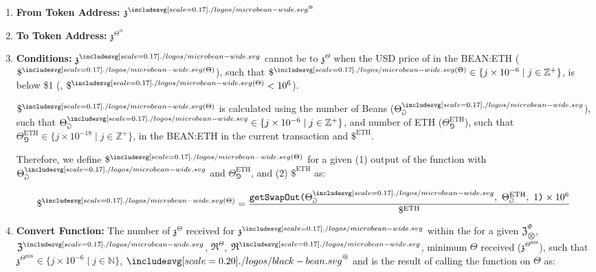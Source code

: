\documentclass[class=article, crop=false]{standalone}
\begin{document}
\begin{enumerate}
    \item \textbf{From Token Address:} $\mathfrak{z}^{\bean^@}$
    
    \item \textbf{To Token Address:} $\mathfrak{z}^{\Theta^@}$
    
    \item \textbf{Conditions:}  \hyperlink{ht233}{$\mathfrak{z}^{\bean}$} cannot be  to  \hyperlink{ht235}{$\mathfrak{z}^{\Theta}$} when the USD price of  in the BEAN:ETH  ($\$^{\bean(\Theta)}$), such that $\$^{\bean(\Theta)}\in \{j \times 10^{-6} \mid j \in \mathbb{Z}^{+} \}$, is below \$1 (, $\$^{\bean(\Theta)} < 10^6$). 

        $\$^{\bean(\Theta)}$ is calculated using the number of Beans ($\Theta_{\Game}^{\bean}$), such that $\Theta_{\Game}^{\bean} \in \{j \times 10^{-6} \mid j \in \mathbb{Z}^{+} \}$, and number of ETH ($\Theta_{\Game}^{\text{ETH}}$), such that $\Theta_{\Game}^{\text{ETH}} \in \{j \times 10^{-18} \mid j \in \mathbb{Z}^{+} \}$, in the BEAN:ETH  in the current transaction and $\$^{\text{ETH}}$.

        Therefore, we define $\$^{\bean(\Theta)}$ for a given (1) output of the   function with $\Theta_{\Game}^{\bean}$ and $\Theta_{\Game}^{\text{ETH}}$, and (2) $\$^{\text{ETH}}$ as:

            $$ \$^{\bean(\Theta)} = \frac{\code{getSwapOut(} \Theta_{\Game}^{\bean},\ \Theta_{\Game}^{\text{ETH}},\ 1 \code{)} \times 10^6 }{\$^{\text{ETH}}}$$

    \item \textbf{Convert Function:} The number of $\mathfrak{z}^{\Theta}$ received for   $\mathfrak{z}^{\bean}$ within the  for a given $\mathfrak{Z}_{\bigotimes}^{\Phi}$, $\mathfrak{Z}^{\bean}$, $\mathfrak{R}^{\Theta}$, $\mathfrak{R}^{\bean}$, minimum  $\Theta$ received ($\mathfrak{z}^{\Theta^{\text{min}}}$), such that $\mathfrak{z}^{\Theta^{\text{min}}} \in \{j \times 10^{-6} \mid j \in \mathbb{N} \}$, $\Beanstalk^{@}$ and  is the result of calling the   function on $\Theta$ as:


\end{enumerate}
\end{document}

